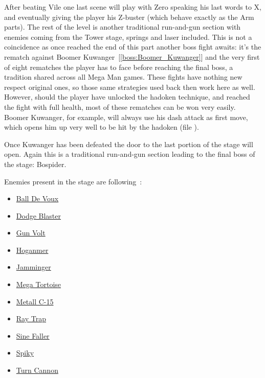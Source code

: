 After beating Vile one last scene will play with Zero speaking his last words to X, and eventually giving the player his Z-buster (which behave exactly as the Arm parts). The rest of the level is another traditional run-and-gun section with enemies coming from the Tower stage, springs and laser included. This is not a coincidence as once reached the end of this part another boss fight awaits: it's the rematch against Boomer Kuwanger~[\ref{boss:Boomer_Kuwanger}] and the very first of eight rematches the player has to face before reaching the final boss, a tradition shared across all Mega Man games. These fights have nothing new respect original ones, so those same strategies used back then work here as well. However, should the player have unlocked the hadoken technique, and reached the fight with full health, most of these rematches can be won very easily. Boomer Kuwanger, for example, will always use his dash attack as first move, which opens him up very well to be hit by the hadoken (file ).

Once Kuwanger has been defeated the door to the last portion of the stage will open. Again this is a traditional run-and-gun section leading to the final boss of the stage: Bospider.

Enemies present in the stage are following~\cite{wiki:sigma_stages}:
\begin{itemize}
	\item \hyperlink {enem:Ball_De_Voux}{Ball De Voux}
	\item \hyperlink {enem:Dodge_Blaster}{Dodge Blaster}
	\item \hyperlink {enem:Gun_Volt}{Gun Volt}
	\item \hyperlink {enem:Hoganmer}{Hoganmer}
	\item \hyperlink {enem:Jamminger}{Jamminger}
	\item \hyperlink {enem:Mega_Tortoise}{Mega Tortoise}
	\item \hyperlink {enem:Metall_C-15}{Metall C-15}
	\item \hyperlink {enem:Ray_Trap}{Ray Trap}
	\item \hyperlink {enem:Sine_Faller}{Sine Faller}
	\item \hyperlink {enem:Spiky}{Spiky}
	\item \hyperlink {enem:Turn_Cannon}{Turn Cannon}
\end{itemize}

